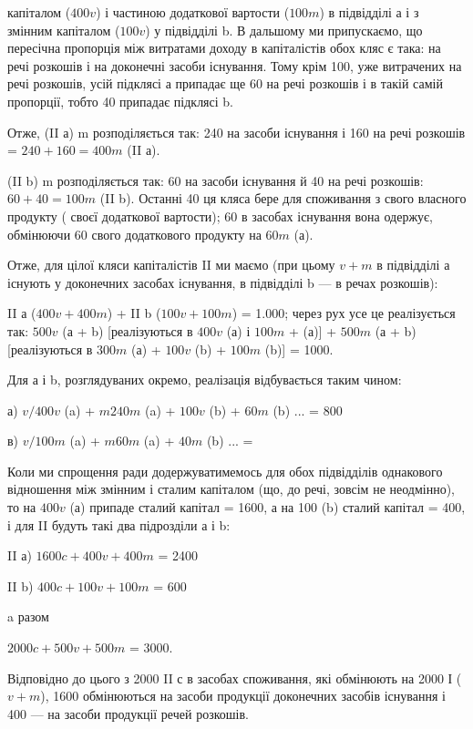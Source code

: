 \parcont{}  %
капіталом ($400 v$) і частиною додаткової вартости ($100 m$) в підвідділі а
і з змінним капіталом ($100 v$) у підвідділі b. В дальшому ми припускаємо,
що пересічна пропорція між витратами доходу в капіталістів обох кляс
є така:  на речі розкошів і  на доконечні засоби існування.
Тому крім 100, уже витрачених на речі розкошів, усій підклясі а припадає
ще 60 на речі розкошів і в такій самій пропорції, тобто 40 припадає
підклясі b.

Отже, (II а) m розподіляється так: 240 на засоби існування і 160 на
речі розкошів = $240 + 160 = 400 m$ (II а).

(II b) m розподіляється так: 60 на засоби існування й 40 на речі
розкошів: $60 + 40 = 100 m$ (II b). Останні 40 ця кляса бере для споживання
з свого власного продукту ( своєї додаткової вартости); 60 в
засобах існування вона одержує, обмінюючи 60 свого додаткового продукту
на $60 m$ (а).

Отже, для цілої кляси капіталістів II ми маємо (при цьому $v + m$ в
підвідділі а існують у доконечних засобах існування, в підвідділі b — в
речах розкошів):

II а ($400 v + 400 m$) + II b ($100 v + 100 m$) = 1.000; через рух усе
це реалізується так: $500 v$ (а + b) [реалізуються в $400 v$ (а) і $100 m$ + (а)] +
$500m$ (а + b) [реалізуються в $300 m$ (а) + $100 v$ (b) + $100 m$ (b)] =
1000.

Для а і b, розглядуваних окремо, реалізація відбувається таким
чином:

а) $v / 400 v$ (a) + $m 240 m$ (a) + $100 v$ (b) + $60 m$ (b) ... = 800

в) $v / 100 m$ (a) + $m 60 m$ (a) + $40 m$ (b) ... = 

Коли ми спрощення ради додержуватимемось для обох підвідділів однакового
відношення між змінним і сталим капіталом (що, до речі, зовсім не неодмінно),
то на $400 v$ (а) припаде сталий капітал = 1600, а на 100 (b)
сталий капітал = 400, і для II будуть такі два підрозділи а і b:

II а) $1600 c + 400 v + 400 m$ = 2400

II b) $400 c + 100 v + 100 m$ = 600

a разом

$2000 c + 500 v + 500 m$ = 3000.

Відповідно до цього з 2000 II с в засобах споживання, які обмінюють
на 2000 І ($v + m$), 1600 обмінюються на засоби продукції доконечних
засобів існування і 400 — на засоби продукції речей розкошів.

